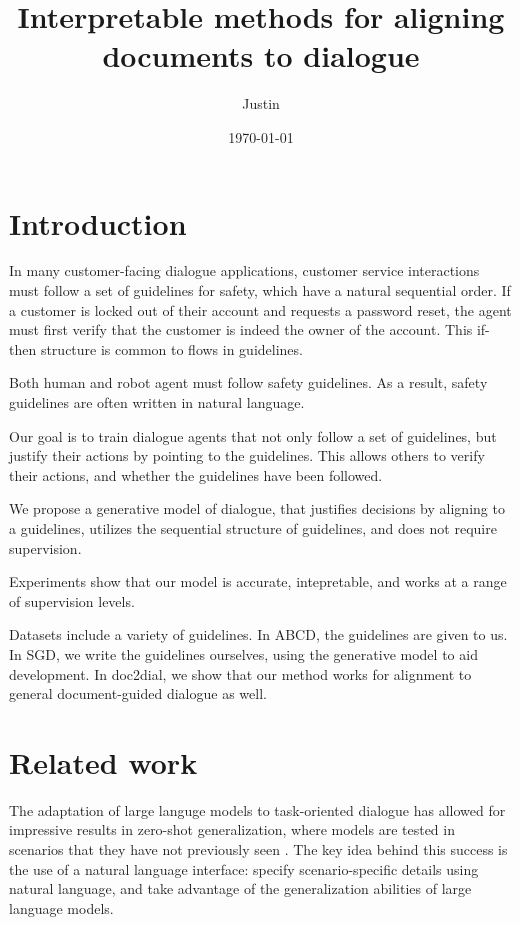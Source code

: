 \documentclass[12pt]{article}
\title{Interpretable methods for aligning documents to dialogue}
\author{Justin}
\date{\today}
\begin{document}
\maketitle

\section{Introduction}
In many customer-facing dialogue applications,
customer service interactions must follow a set of guidelines for safety,
which have a natural sequential order.
If a customer is locked out of their account and requests a password reset,
the agent must first verify that the customer is indeed the owner of the account.
This if-then structure is common to flows in guidelines.

Both human and robot agent must follow safety guidelines.
As a result, safety guidelines are often written in natural language.

Our goal is to train dialogue agents that not only follow a set of guidelines,
but justify their actions by pointing to the guidelines.
This allows others to verify their actions, and whether the guidelines have been followed.

We propose a generative model of dialogue,
that justifies decisions by aligning to a guidelines,
utilizes the sequential structure of guidelines,
and does not require supervision.

Experiments show that our model is accurate,
intepretable,
and works at a range of supervision levels.

Datasets include a variety of guidelines.
In ABCD, the guidelines are given to us.
In SGD, we write the guidelines ourselves,
using the generative model to aid development.
In doc2dial, we show that our method works for alignment to general document-guided
dialogue as well.

\section{Related work}
The adaptation of large languge models to task-oriented dialogue
has allowed for impressive results in zero-shot generalization,
where models are tested in scenarios that they have not previously seen
\cite{}.
The key idea behind this success is the use of a natural language interface:
specify scenario-specific details using natural language,
and take advantage of the generalization abilities of large language models.
\end{document}
